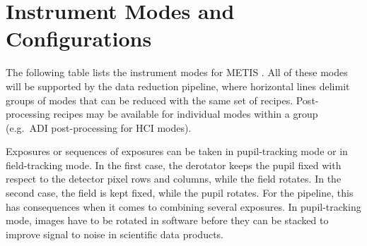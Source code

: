 \section{Instrument Modes and Configurations}
\label{sec:instrument_modes}

The following table lists the instrument modes for METIS
\cite{METIS-operational_concept}. All of these modes will be
supported by the data reduction pipeline, where horizontal lines
delimit groups of modes that can be reduced with the same set of
recipes.  Post-processing recipes may be available for individual
modes within a group (e.g.\ ADI post-processing for HCI modes).

Exposures or sequences of exposures can be taken in pupil-tracking
mode or in field-tracking mode. In the first case, the derotator keeps
the pupil fixed with respect to the detector pixel rows and columns,
while the field rotates. In the second case, the field is kept fixed,
while the pupil rotates. For the pipeline, this has consequences when
it comes to combining several exposures. In pupil-tracking mode,
images have to be rotated in software before they can be stacked to
improve signal to noise in scientific data products.

